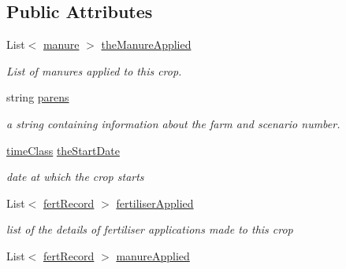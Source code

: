 \subsection*{Public Attributes}
\begin{DoxyCompactItemize}
\item 
\mbox{\label{class_crop_class_a1bc000e4e6a0cf14b434274ef79df30c}} 
List$<$ \mbox{\hyperlink{classmanure}{manure}} $>$ \mbox{\hyperlink{class_crop_class_a1bc000e4e6a0cf14b434274ef79df30c}{the\+Manure\+Applied}}
\begin{DoxyCompactList}\small\item\em List of manures applied to this crop. \end{DoxyCompactList}\item 
\mbox{\label{class_crop_class_a157b2bf636da40932ea48a3249393492}} 
string \mbox{\hyperlink{class_crop_class_a157b2bf636da40932ea48a3249393492}{parens}}
\begin{DoxyCompactList}\small\item\em a string containing information about the farm and scenario number. \end{DoxyCompactList}\item 
\mbox{\label{class_crop_class_a41695be056fe34551f06f3e8e675d22d}} 
\mbox{\hyperlink{classtime_class}{time\+Class}} \mbox{\hyperlink{class_crop_class_a41695be056fe34551f06f3e8e675d22d}{the\+Start\+Date}}
\begin{DoxyCompactList}\small\item\em date at which the crop starts \end{DoxyCompactList}\item 
\mbox{\label{class_crop_class_a63227de619d72a3ed18a15bdb1dde535}} 
List$<$ \mbox{\hyperlink{classfert_record}{fert\+Record}} $>$ \mbox{\hyperlink{class_crop_class_a63227de619d72a3ed18a15bdb1dde535}{fertiliser\+Applied}}
\begin{DoxyCompactList}\small\item\em list of the details of fertiliser applications made to this crop \end{DoxyCompactList}\item 
\mbox{\label{class_crop_class_af407b536de242900a53aa2defc117acc}} 
List$<$ \mbox{\hyperlink{classfert_record}{fert\+Record}} $>$ \mbox{\hyperlink{class_crop_class_af407b536de242900a53aa2defc117acc}{manure\+Applied}}

\end{DoxyCompactItemize}
